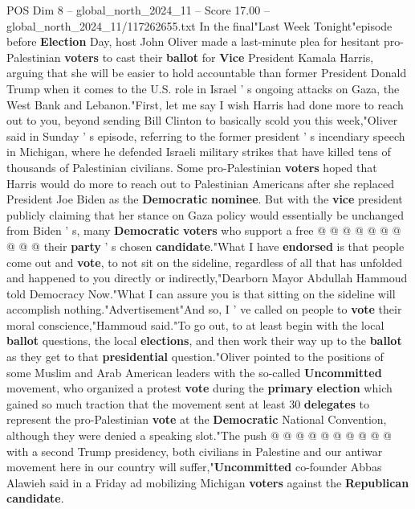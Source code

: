\begin{textsample}{POS Dim 8 – global\_north\_2024\_11 – Score 17.00 – global\_north\_2024\_11/117262655.txt}  \label{ex:f8_pos_149}
In the final"Last Week Tonight"episode before \textbf{Election} Day, host John Oliver made a last-minute plea for hesitant pro-Palestinian \textbf{voters} to cast their \textbf{ballot} for \textbf{Vice} President Kamala Harris, arguing that she will be easier to hold accountable than former President Donald Trump when it comes to the U.S. role in Israel ' s ongoing attacks on Gaza, the West Bank and Lebanon."First, let me say I wish Harris had done more to reach out to you, beyond sending Bill Clinton to basically scold you this week,"Oliver said in Sunday ' s episode, referring to the former president ' s incendiary speech in Michigan, where he defended Israeli military strikes that have killed tens of thousands of Palestinian civilians.
Some pro-Palestinian \textbf{voters} hoped that Harris would do more to reach out to Palestinian Americans after she replaced President Joe Biden as the \textbf{Democratic} \textbf{nominee}.
But with the \textbf{vice} president publicly claiming that her stance on Gaza policy would essentially be unchanged from Biden ' s, many \textbf{Democratic} \textbf{voters} who support a free @ @ @ @ @ @ @ @ @ @ their \textbf{party} ' s chosen \textbf{candidate}."What I have \textbf{endorsed} is that people come out and \textbf{vote}, to not sit on the sideline, regardless of all that has unfolded and happened to you directly or indirectly,"Dearborn Mayor Abdullah Hammoud told Democracy Now."What I can assure you is that sitting on the sideline will accomplish nothing."Advertisement"And so, I ' ve called on people to \textbf{vote} their moral conscience,"Hammoud said."To go out, to at least begin with the local \textbf{ballot} questions, the local \textbf{elections}, and then work their way up to the \textbf{ballot} as they get to that \textbf{presidential} question."Oliver pointed to the positions of some Muslim and Arab American leaders with the so-called \textbf{Uncommitted} movement, who organized a protest \textbf{vote} during the \textbf{primary} \textbf{election} which gained so much traction that the movement sent at least 30 \textbf{delegates} to represent the pro-Palestinian \textbf{vote} at the \textbf{Democratic} National Convention, although they were denied a speaking slot."The push @ @ @ @ @ @ @ @ @ @ with a second Trump presidency, both civilians in Palestine and our antiwar movement here in our country will suffer,"\textbf{Uncommitted} co-founder Abbas Alawieh said in a Friday ad mobilizing Michigan \textbf{voters} against the \textbf{Republican} \textbf{candidate}.

\end{textsample}

